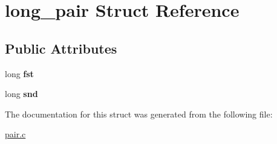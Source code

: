 \hypertarget{structlong__pair}{}\section{long\+\_\+pair Struct Reference}
\label{structlong__pair}
\subsection*{Public Attributes}
\begin{DoxyCompactItemize}
\item 
\mbox{\label{structlong__pair_a7cfd71dae8a1bff732fbf8a372129327}} 
long {\bfseries fst}
\item 
\mbox{\label{structlong__pair_ac6845698d9c04e20c768f12181598503}} 
long {\bfseries snd}
\end{DoxyCompactItemize}


The documentation for this struct was generated from the following file\+:\begin{DoxyCompactItemize}
\item 
\hyperlink{pair_8c}{pair.\+c}\end{DoxyCompactItemize}
